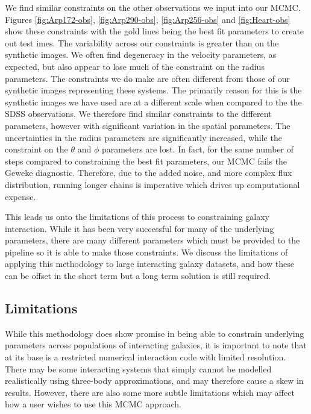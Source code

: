 We find similar constraints on the other observations we input into our MCMC. Figures \ref{fig:Arp172-obs}, \ref{fig:Arp290-obs}, \ref{fig:Arp256-obs} and \ref{fig:Heart-obs} show these constraints with the gold lines being the best fit parameters to create out test imes. The variability across our constraints is greater than on the synthetic images. We often find degeneracy in the velocity parameters, as expected, but also appear to lose much of the constraint on the radius parameters. The constraints we do make are often different from those of our synthetic images representing these systems. The primarily reason for this is the synthetic images we have used are at a different scale when compared to the the SDSS observations. We therefore find similar constraints to the different parameters, however with significant variation in the spatial parameters. The uncertainties in the radius parameters are significantly increased, while the constraint on the $\theta$ and $\phi$ parameters are lost. In fact, for the same number of steps compared to constraining the best fit parameters, our MCMC fails the Geweke diagnostic. Therefore, due to the added noise, and more complex flux distribution, running longer chains is imperative which drives up computational expense.

This leads us onto the limitations of this process to constraining galaxy interaction. While it has been very successful for many of the underlying parameters, there are many different parameters which must be provided to the pipeline so it is able to make those constraints. We discuss the limitations of applying this methodology to large interacting galaxy datasets, and how these can be offset in the short term but a long term solution is still required.

\subsection{Limitations}\label{limitations}
\noindent While this methodology does show promise in being able to constrain underlying parameters across populations of interacting galaxies, it is important to note that at its base is a restricted numerical interaction code with limited resolution. There may be some interacting systems that simply cannot be modelled realistically using three-body approximations, and may therefore cause a skew in results. However, there are also some more subtle limitations which may affect how a user wishes to use this MCMC approach.

